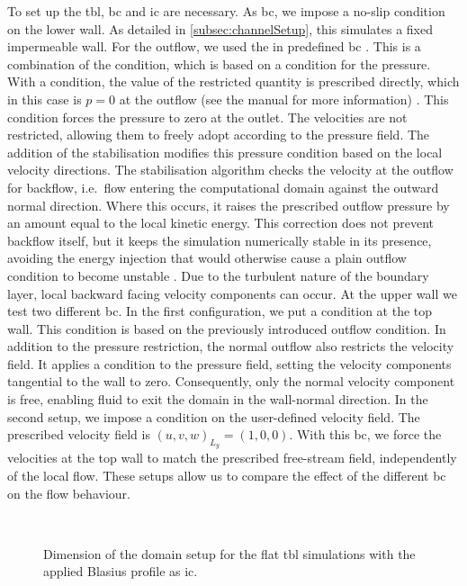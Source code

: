 To set up the \acrshort{tbl}, \acrshort{bc} and \acrshort{ic} are necessary. 
As \acrshort{bc}, we impose a no-slip condition on the lower wall.
As detailed in \autoref{subsec:channelSetup}, this simulates a fixed impermeable wall.
For the outflow, we used the in  predefined \acrshort{bc} .
This is a combination of the  condition, which is based on a  condition for the pressure.
With a  condition, the value of the restricted quantity is prescribed directly, which in this case is $p = 0$ at the outflow (see the  manual for more information) \citep{jansson_neko_2024}.
This condition forces the pressure to zero at the outlet. 
The velocities are not restricted, allowing them to freely adopt according to the pressure field.
The addition of the  stabilisation modifies this pressure condition based on the local velocity directions. 
The stabilisation algorithm checks the velocity at the outflow for backflow, i.e.~flow entering the computational domain against the outward normal direction.
Where this occurs, it raises the prescribed outflow pressure by an amount equal to the local kinetic energy. 
This correction does not prevent backflow itself, but it keeps the simulation numerically stable in its presence, avoiding the energy injection that would otherwise cause a plain outflow condition to become unstable \citep{dong_robust_2014}.
Due to the turbulent nature of the boundary layer, local backward facing velocity components can occur.
At the upper wall we test two different \acrshort{bc}.
In the first configuration, we put a  condition at the top wall.
This condition is based on the previously introduced outflow condition.
In addition to the pressure restriction, the normal outflow also restricts the velocity field.
It applies a  condition to the pressure field, setting the velocity components tangential to the wall to zero.
Consequently, only the normal velocity component is free, enabling fluid to exit the domain in the wall-normal direction.
In the second setup, we impose a  condition on the user-defined velocity field.
The prescribed velocity field is $(u, v, w)_{L_y} = (1, 0, 0)$.
With this \acrshort{bc}, we force the velocities at the top wall to match the prescribed free-stream field, independently of the local flow.
These setups allow us to compare the effect of the different \acrshort{bc} on the flow behaviour. 

\begin{figure}[H]
    \centering
    
    \\[-15pt]
    \caption{Dimension of the domain setup for the flat \acrshort{tbl} simulations with the applied Blasius profile as \acrshort{ic}.}
    \label{fig:flatTBL_IC}
\end{figure}


